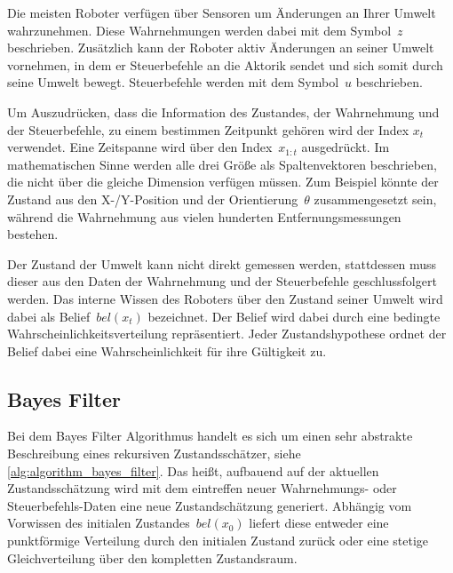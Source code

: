 Die meisten Roboter verfügen über Sensoren um Änderungen an Ihrer Umwelt wahrzunehmen. Diese Wahrnehmungen werden dabei mit dem Symbol~$z$ beschrieben. Zusätzlich kann der Roboter aktiv Änderungen an seiner Umwelt vornehmen, in dem er Steuerbefehle an die Aktorik sendet und sich somit durch seine Umwelt bewegt. Steuerbefehle werden mit dem Symbol~$u$ beschrieben.

Um Auszudrücken, dass die Information des Zustandes, der Wahrnehmung und der Steuerbefehle, zu einem bestimmen Zeitpunkt gehören wird der Index $x_t$ verwendet. Eine Zeitspanne wird über den Index~$x_{1:t}$ ausgedrückt. Im mathematischen Sinne werden alle drei Größe als Spaltenvektoren beschrieben, die nicht über die gleiche Dimension verfügen müssen. Zum Beispiel könnte der Zustand aus den X-/Y-Position und der Orientierung~$\theta$ zusammengesetzt sein, während die Wahrnehmung aus vielen hunderten Entfernungsmessungen bestehen.

Der Zustand der Umwelt kann nicht direkt gemessen werden, stattdessen muss dieser aus den Daten der Wahrnehmung und der Steuerbefehle geschlussfolgert werden. Das interne Wissen des Roboters über den Zustand seiner Umwelt wird dabei als Belief~$bel(x_t)$ bezeichnet. Der Belief wird dabei durch eine bedingte Wahrscheinlichkeitsverteilung repräsentiert. Jeder Zustandshypothese ordnet der Belief dabei eine Wahrscheinlichkeit für ihre Gültigkeit zu.


%
%
\subsection{Bayes Filter}

Bei dem Bayes Filter Algorithmus handelt es sich um einen sehr abstrakte Beschreibung eines rekursiven Zustandsschätzer, siehe \autoref{alg:algorithm_bayes_filter}. Das heißt, aufbauend  auf der aktuellen Zustandsschätzung wird mit dem eintreffen neuer Wahrnehmungs- oder Steuerbefehls-Daten eine neue Zustandschätzung generiert. Abhängig vom Vorwissen des initialen \mbox{Zustandes~$bel(x_0)$} liefert diese entweder eine punktförmige Verteilung durch den initialen Zustand zurück oder eine stetige Gleichverteilung über den kompletten Zustandsraum. 

